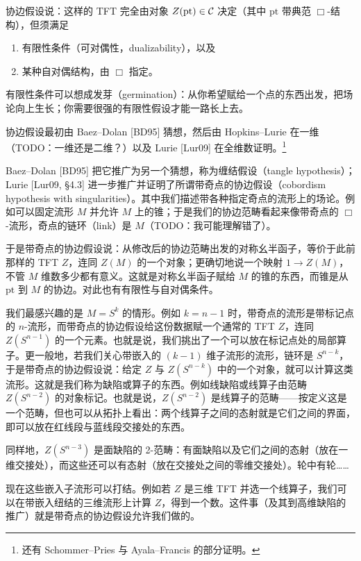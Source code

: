 协边假设说：这样的 TFT 完全由对象 $Z(\mathrm{pt})\in\mathcal{C}$ 决定（其中 $\mathrm{pt}$ 带典范 $\Box$-结构），但须满足
\begin{enumerate}
\item 有限性条件（可对偶性，dualizability），以及
\item 某种自对偶结构，由 $\Box$ 指定。
\end{enumerate}
有限性条件可以想成发芽（germination）：从你希望赋给一个点的东西出发，把场论向上生长；你需要很强的有限性假设才能一路长上去。

协边假设最初由 Baez--Dolan [BD95] 猜想，然后由 Hopkins--Lurie 在一维（TODO：一维还是二维？）以及 Lurie [Lur09] 在全维数证明。\footnote{还有 Schommer--Pries 与 Ayala--Francis 的部分证明。}

Baez--Dolan [BD95] 把它推广为另一个猜想，称为缠结假设（tangle hypothesis）；Lurie [Lur09, §4.3] 进一步推广并证明了所谓带奇点的协边假设（cobordism hypothesis with singularities）。其中我们描述带各种指定奇点的流形上的场论。例如可以固定流形 $M$ 并允许 $M$ 上的锥；于是我们的协边范畴看起来像带奇点的 $\Box$-流形，奇点的链环（link）是 $M$（TODO：我可能理解错了）。

于是带奇点的协边假设说：从修改后的协边范畴出发的对称幺半函子，等价于此前那样的 TFT $Z$，连同 $Z(M)$ 的一个对象；更确切地说一个映射 $1\to Z(M)$，不管 $M$ 维数多少都有意义。这就是对称幺半函子赋给 $M$ 的锥的东西，而锥是从 $\mathrm{pt}$ 到 $M$ 的协边。对此也有有限性与自对偶条件。

我们最感兴趣的是 $M=S^k$ 的情形。例如 $k=n-1$ 时，带奇点的流形是带标记点的 $n$-流形，而带奇点的协边假设给这份数据赋一个通常的 TFT $Z$，连同 $Z(S^{n-1})$ 的一个元素。也就是说，我们挑出了一个可以放在标记点处的局部算子。更一般地，若我们关心带嵌入的 $(k-1)$ 维子流形的流形，链环是 $S^{n-k}$，于是带奇点的协边假设说：给定 $Z$ 与 $Z(S^{n-k})$ 中的一个对象，就可以计算这类流形。这就是我们称为缺陷或算子的东西。例如线缺陷或线算子由范畴 $Z(S^{n-2})$ 的对象标记。也就是说，$Z(S^{n-2})$ 是线算子的范畴——按定义这是一个范畴，但也可以从拓扑上看出：两个线算子之间的态射就是它们之间的界面，即可以放在红线段与蓝线段交接处的东西。


同样地，$Z(S^{n-3})$ 是面缺陷的 2-范畴：有面缺陷以及它们之间的态射（放在一维交接处），而这些还可以有态射（放在交接处之间的零维交接处）。轮中有轮……

现在这些嵌入子流形可以打结。例如若 $Z$ 是三维 TFT 并选一个线算子，我们可以在带嵌入纽结的三维流形上计算 $Z$，得到一个数。这件事（及其到高维缺陷的推广）就是带奇点的协边假设允许我们做的。


